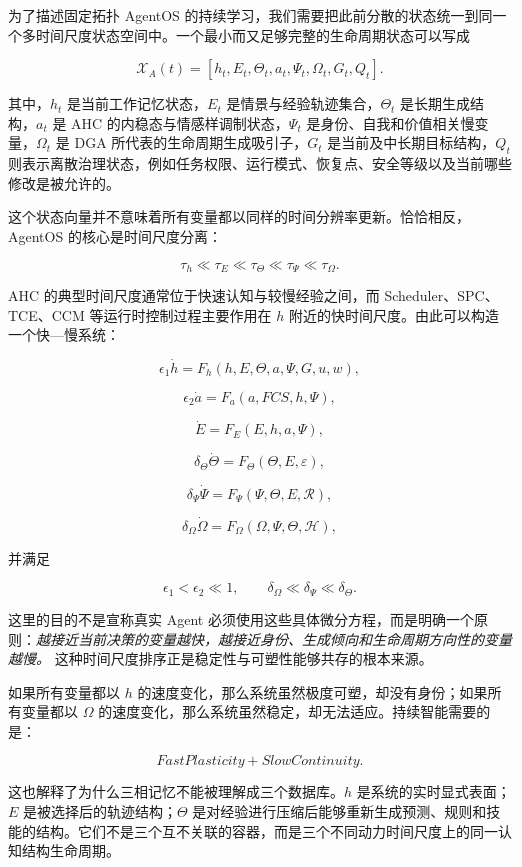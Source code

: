 为了描述固定拓扑 AgentOS 的持续学习，我们需要把此前分散的状态统一到同一个多时间尺度状态空间中。一个最小而又足够完整的生命周期状态可以写成

\[
\boxed{
\mathcal{X}_A(t)
=
\left[
h_t,
E_t,
\Theta_t,
a_t,
\Psi_t,
\Omega_t,
G_t,
Q_t
\right].
}
\]

其中，$h_t$ 是当前工作记忆状态，$E_t$ 是情景与经验轨迹集合，$\Theta_t$ 是长期生成结构，$a_t$ 是 AHC 的内稳态与情感样调制状态，$\Psi_t$ 是身份、自我和价值相关慢变量，$\Omega_t$ 是 DGA 所代表的生命周期生成吸引子，$G_t$ 是当前及中长期目标结构，$Q_t$ 则表示离散治理状态，例如任务权限、运行模式、恢复点、安全等级以及当前哪些修改是被允许的。

这个状态向量并不意味着所有变量都以同样的时间分辨率更新。恰恰相反，AgentOS 的核心是时间尺度分离：

\[
\boxed{
\tau_h
\ll
\tau_E
\ll
\tau_\Theta
\ll
\tau_\Psi
\ll
\tau_\Omega.
}
\]

AHC 的典型时间尺度通常位于快速认知与较慢经验之间，而 Scheduler、SPC、TCE、CCM 等运行时控制过程主要作用在 $h$ 附近的快时间尺度。由此可以构造一个快---慢系统：

\[
\epsilon_1\dot{h}
=
F_h
(h,E,\Theta,a,\Psi,G,u,w),
\]

\[
\epsilon_2\dot{a}
=
F_a
(a,FCS,h,\Psi),
\]

\[
\dot{E}
=
F_E(E,h,a,\Psi),
\]

\[
\delta_\Theta\dot{\Theta}
=
F_\Theta(\Theta,E,\varepsilon),
\]

\[
\delta_\Psi\dot{\Psi}
=
F_\Psi(\Psi,\Theta,E,\mathcal{R}),
\]

\[
\delta_\Omega\dot{\Omega}
=
F_\Omega(\Omega,\Psi,\Theta,\mathcal{H}),
\]

并满足

\[
\epsilon_1
<
\epsilon_2
\ll
1,
\qquad
\delta_\Omega
\ll
\delta_\Psi
\ll
\delta_\Theta.
\]

这里的目的不是宣称真实 Agent 必须使用这些具体微分方程，而是明确一个原则：\emph{越接近当前决策的变量越快，越接近身份、生成倾向和生命周期方向性的变量越慢。} 这种时间尺度排序正是稳定性与可塑性能够共存的根本来源。

如果所有变量都以 $h$ 的速度变化，那么系统虽然极度可塑，却没有身份；如果所有变量都以 $\Omega$ 的速度变化，那么系统虽然稳定，却无法适应。持续智能需要的是：

\[
\boxed{
FastPlasticity
+
SlowContinuity.
}
\]

这也解释了为什么三相记忆不能被理解成三个数据库。$h$ 是系统的实时显式表面；$E$ 是被选择后的轨迹结构；$\Theta$ 是对经验进行压缩后能够重新生成预测、规则和技能的结构。它们不是三个互不关联的容器，而是三个不同动力时间尺度上的同一认知结构生命周期。

